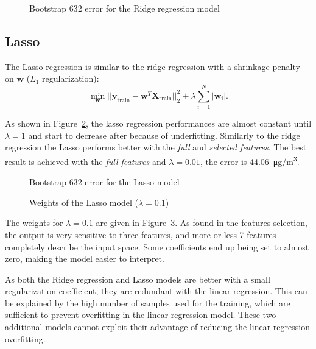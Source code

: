 \documentclass[journal,11pt]{IEEEtran}
\begin{document}
\begin{figure}[H]
    \centering
    
    \caption{Bootstrap 632 error for the Ridge regression model}
    \label{fig:RR}
\end{figure}

\subsection{Lasso}

The Lasso regression is similar to the ridge regression with a shrinkage penalty on $\mathbf{w}$ ($L_1$ regularization): $$\displaystyle \min_{\mathbf{w}} ||\mathbf{y}_{\text{train}} - \mathbf{w}^T\mathbf{X}_{\text{train}}||_2^2 + \lambda \sum_{i=1}^N |\mathbf{w_i}|.$$

As shown in Figure~\ref{fig:Lasso}, the lasso regression performances are almost constant until $\lambda = 1$ and start to decrease after because of underfitting. Similarly to the ridge regression the Lasso performs better with the \textit{full} and \textit{selected features}. The best result is achieved with the \textit{full features} and $\lambda = 0.01$, the error is \SI{44.06}{\micro g/m^3}. 

\begin{figure}[H]
    \centering
    
    \caption{Bootstrap 632 error for the Lasso model}
    \label{fig:Lasso}
\end{figure}

\begin{figure}[H]
    \centering
    
    \caption{Weights of the Lasso model ($\lambda = 0.1$)}
    \label{fig:Lasso_weights}
\end{figure}

The weights for $\lambda = 0.1$ are given in Figure~\ref{fig:Lasso_weights}. As found in the features selection, the output is very sensitive to three features, and more or less 7 features completely describe the input space. Some coefficients end up being set to almost zero, making the model easier to interpret.

As both the Ridge regression and Lasso models are better with a small regularization coefficient, they are redundant with the linear regression. This can be explained by the high number of samples used for the training, which are sufficient to prevent overfitting in the linear regression model. These two additional models cannot exploit their advantage of reducing the linear regression overfitting.
\end{document}
